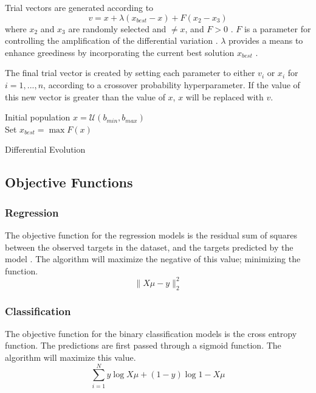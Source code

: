 \documentclass[conference]{IEEEtran}
\begin{document}
Trial vectors are generated according to
$$
    v = x + \lambda (x_{best} - x) + F (x_2 - x_3)
$$
where $x_2$ and $x_3$ are randomly selected and $\neq x$, and $F > 0$ \cite{de}. $F$ is a parameter for controlling the amplification of 
the differential variation \cite{de}. $\lambda$ provides a means to enhance greediness by incorporating the current best solution $x_{best}$ \cite{de}.

The final trial vector is created by setting each parameter to either $v_i$ or $x_i$ for $i = 1, ..., n$, according to a crossover probability 
hyperparameter. If the value of this new vector is greater than the value of $x$, $x$ will be replaced with $v$.

\begin{algorithm}[htbp]
\SetAlgoLined
{}
    Initial population $x = \mathcal{U}(b_{min}, b_{max})$ \\
    Set $x_{best} = \max{F(x)}$ \\
\caption{Differential Evolution}
\label{alg:dev}
\end{algorithm}

\subsection{Objective Functions}
\subsubsection{Regression}
The objective function for the regression models is the residual sum of squares between the observed targets in the dataset, and the targets 
predicted by the model \cite{scikit}. The algorithm will maximize the negative of this value; minimizing the function.
$$
    \lVert X\mu - y \rVert_{2}^{2}
$$

\subsubsection{Classification}
The objective function for the binary classification models is the cross entropy function. The predictions are first passed through a sigmoid function. 
The algorithm will maximize this value.
$$
    \sum_{i=1}^{N}{y \log{X\mu} + (1 - y)\log{1 - X\mu}}
$$
\end{document}

